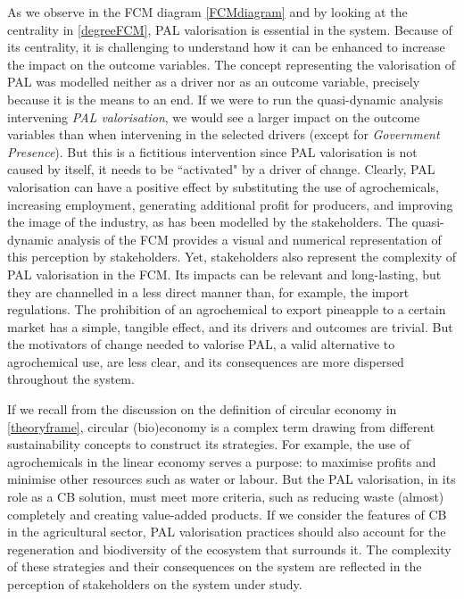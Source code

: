 As we observe in the FCM diagram \cref{FCMdiagram} and by looking at the centrality in \cref{degreeFCM}, PAL valorisation is essential in the system.  Because of its centrality, it is challenging to understand how it can be enhanced to increase the impact on the outcome variables. The concept representing the valorisation of PAL was modelled neither as a driver nor as an outcome variable, precisely because it is the means to an end. If we were to run the quasi-dynamic analysis intervening \textit{PAL valorisation}, we would see a larger impact on the outcome variables than when intervening in the selected drivers (except for \textit{Government Presence}). But this is a fictitious intervention since PAL valorisation is not caused by itself, it needs to be ``activated" by a driver of change. Clearly, PAL valorisation can have a positive effect by substituting the use of agrochemicals, increasing employment, generating additional profit for producers, and improving the image of the industry, as has been modelled by the stakeholders. The quasi-dynamic analysis of the FCM provides a visual and numerical representation of this perception by stakeholders. Yet, stakeholders also represent the complexity of PAL valorisation in the FCM. Its impacts can be relevant and long-lasting, but they are channelled in a less direct manner than, for example, the import regulations. The prohibition of an agrochemical to export pineapple to a certain market has a simple, tangible effect, and its drivers and outcomes are trivial. But the motivators of change needed to valorise PAL, a valid alternative to agrochemical use, are less clear, and its consequences are more dispersed throughout the system. 

If we recall from the discussion on the definition of circular economy in \cref{theoryframe}, circular (bio)economy is a complex term drawing from different sustainability concepts to construct its strategies. For example, the use of agrochemicals in the linear economy serves a purpose: to maximise profits and minimise other resources such as water or labour. But the PAL valorisation, in its role as a CB solution, must meet more criteria, such as reducing waste (almost) completely and creating value-added products. If we  consider the features of CB in the agricultural sector, PAL valorisation practices should also account for the regeneration and biodiversity of the ecosystem that surrounds it. The complexity of these strategies and their consequences on the system are reflected in the perception of stakeholders on the system under study. 

